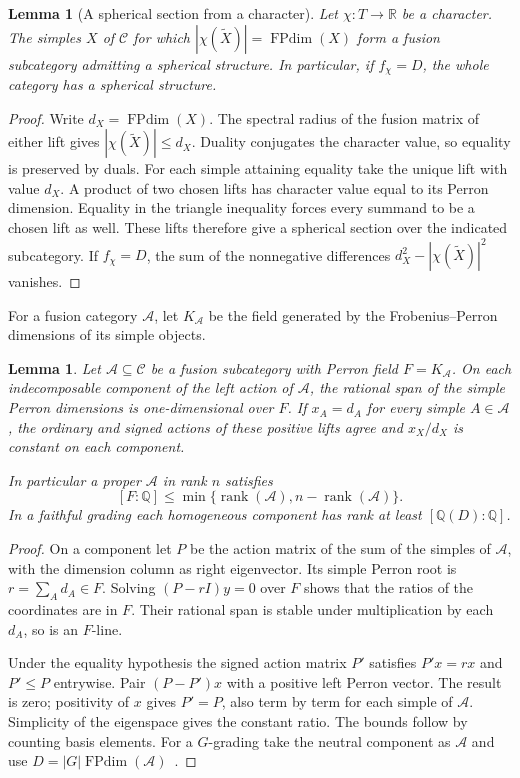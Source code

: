 \documentclass[11pt,reqno]{amsart}
\newtheorem{lemma}[theorem]{Lemma}
\theoremstyle{remark}\newtheorem{remark}[theorem]{Remark}
\numberwithin{equation}{section}
\begin{document}
\begin{lemma}[A spherical section from a character]\label{lem:section-signs}
Let $\chi:T\to\mathbb R$ be a character. The simples $X$ of $\mathcal C$
for which $|\chi(\widetilde X)|=\operatorname{FPdim}(X)$ form a fusion
subcategory admitting a spherical structure. In particular, if
$f_\chi=D$, the whole category has a spherical structure.
\end{lemma}
\begin{proof}
Write $d_X=\operatorname{FPdim}(X)$. The spectral radius of the
fusion matrix of either lift gives $|\chi(\widetilde X)|\le d_X$.
Duality conjugates the character value, so equality is preserved by
duals. For each simple attaining equality take the unique lift with
value $d_X$. A product of two chosen lifts has character value equal
to its Perron dimension. Equality in the triangle inequality forces
every summand to be a chosen lift as well. These lifts therefore give
a spherical section over the indicated subcategory. If $f_\chi=D$,
the sum of the nonnegative differences
$d_X^2-|\chi(\widetilde X)|^2$ vanishes.
\end{proof}

For a fusion category $\mathcal A$, let $K_{\mathcal A}$ be the field
generated by the Frobenius--Perron dimensions of its simple objects.

\begin{lemma}\label{lem:field-corank}
Let $\mathcal A\subseteq\mathcal C$ be a fusion subcategory with
Perron field $F=K_{\mathcal A}$. On each indecomposable component
of the left action of $\mathcal A$, the rational span of the simple Perron
dimensions is one-dimensional over $F$. If $x_A=d_A$ for every simple
$A\in\mathcal A$, the ordinary and signed actions of these positive
lifts agree and $x_X/d_X$ is constant on each component.

In particular a proper $\mathcal A$ in rank $n$ satisfies
\[
 [F:\mathbb Q]\le\min\{\operatorname{rank}(\mathcal A),
                         n-\operatorname{rank}(\mathcal A)\}.
\]
In a faithful grading each homogeneous component has rank at least
$[\mathbb Q(D):\mathbb Q]$.
\end{lemma}
\begin{proof}
On a component let $P$ be the action matrix of the sum of the simples
of $\mathcal A$, with the dimension column as right eigenvector.
Its simple Perron root is $r=\sum_A d_A\in F$. Solving $(P-rI)y=0$
over $F$ shows that the ratios of the coordinates are in $F$.
Their rational span is stable under multiplication by each $d_A$,
so is an $F$-line.

Under the equality hypothesis the signed action matrix $P'$ satisfies
$P' x=rx$ and $P'\le P$ entrywise. Pair $(P-P')x$ with a positive
left Perron vector. The result is zero; positivity of $x$ gives
$P'=P$, also term by term for each simple of $\mathcal A$.
Simplicity of the eigenspace gives the constant ratio.
The bounds follow by counting basis elements. For a $G$-grading
take the neutral component as $\mathcal A$ and use
$D=|G|\operatorname{FPdim}(\mathcal A)$~\cite[Proposition~8.20]{ENO}.
\end{proof}
\end{document}
